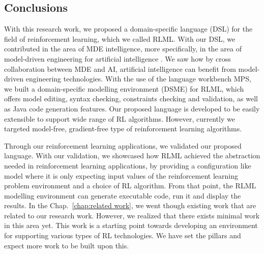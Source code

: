 \documentclass[11pt,letterpaper]{ryersonSGSThesis}
\begin{document}
\begin{ryersonSGSThesis}
\chapter{Conclusions}
\label{chap:conclusions}
    With this research work, we proposed a domain-specific language (DSL) for the field of reinforcement learning, which we called RLML. With our DSL, we contributed in the area of MDE intelligence, more specifically, in the area of model-driven engineering for artificial intelligence \cite{MDEAI}. We saw how by cross collaboration between MDE and AI, artificial intelligence can benefit from model-driven engineering technologies. With the use of the language workbench MPS, we built a domain-specific modelling environment (DSME) for RLML, which offers model editing, syntax checking, constraints checking and validation, as well as Java code generation features. Our proposed language is developed to be easily extensible to support wide range of RL algorithms. However, currently we targeted model-free, gradient-free type of reinforcement learning algorithms.
    
    Through our reinforcement learning applications, we validated our proposed language. With our validation, we showcased how RLML achieved the abstraction needed in reinforcement learning applications, by providing a configuration like model where it is only expecting input values of the reinforcement learning problem environment and a choice of RL algorithm. From that point, the RLML modelling environment can generate executable code, run it and display the results. In the Chap.~\ref{chap:related work}, we went though existing work that are related to our research work. However, we realized that there exists minimal work in this area yet. This work is a starting point towards developing an environment for supporting various types of RL technologies. We have set the pillars and expect more work to be built upon this. 


\end{ryersonSGSThesis}
\end{document}
